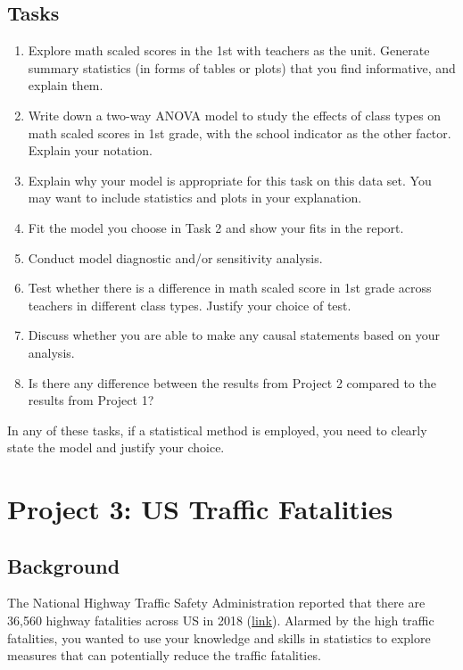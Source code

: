 \documentclass[12pt,]{book}
\begin{document}
\subsection{Tasks}\label{tasks-1}

\begin{enumerate}
\def\labelenumi{\arabic{enumi}.}
\item
  Explore math scaled scores in the 1st with teachers as the unit.
  Generate summary statistics (in forms of tables or plots) that you
  find informative, and explain them.
\item
  Write down a two-way ANOVA model to study the effects of class types
  on math scaled scores in 1st grade, with the school indicator as the
  other factor. Explain your notation.
\item
  Explain why your model is appropriate for this task on this data set.
  You may want to include statistics and plots in your explanation.
\item
  Fit the model you choose in Task 2 and show your fits in the report.
\item
  Conduct model diagnostic and/or sensitivity analysis.
\item
  Test whether there is a difference in math scaled score in 1st grade
  across teachers in different class types. Justify your choice of test.
\item
  Discuss whether you are able to make any causal statements based on
  your analysis.
\item
  Is there any difference between the results from Project 2 compared to
  the results from Project 1?
\end{enumerate}

In any of these tasks, if a statistical method is employed, you need to
clearly state the model and justify your choice.

\section{Project 3: US Traffic
Fatalities}\label{project-3-us-traffic-fatalities}

\subsection{Background}\label{background-2}

The National Highway Traffic Safety Administration reported that there
are 36,560 highway fatalities across US in 2018
(\href{nhtsa.gov/press-releases/roadway-fatalities-2018-fars}{link}).
Alarmed by the high traffic fatalities, you wanted to use your knowledge
and skills in statistics to explore measures that can potentially reduce
the traffic fatalities.
\end{document}
